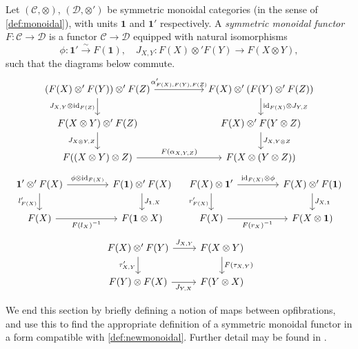 \documentclass{MetricNotes2023}
\def\id{\ensuremath\text{id}}
\begin{document}
\begin{definition}
Let \((\mathcal{C}, \otimes)\), \((\mathcal{D}, \otimes')\) be symmetric monoidal categories (in the sense of \ref{def:monoidal}), with units \(\textbf{1}\) and \(\textbf{1}'\) respectively. A \textit{symmetric monoidal functor} \(F : \mathcal{C} \to \mathcal{D}\) is a functor \(\mathcal{C} \to \mathcal{D}\) equipped with natural isomorphisms
\[\phi : \textbf{1}'\xrightarrow\sim F(\textbf{1}), \quad J_{X,Y} : F(X)\otimes' F(Y) \to F(X\otimes Y),\]
such that the diagrams below commute.
\[\begin{tikzcd}[column sep=12ex]
(F(X)\otimes' F(Y))\otimes' F(Z) \arrow[r, "\alpha'_{F(X), F(Y), F(Z)}"] \arrow[d, swap, "J_{X,Y}\otimes\id_{F(Z)}"]  & F(X)\otimes' (F(Y)\otimes' F(Z)) \arrow[d, "\id_{F(X)}\otimes J_{Y,Z}"]  \\
F(X\otimes Y)\otimes' F(Z) \arrow[d, swap, "J_{X\otimes Y, Z}"]  & F(X)\otimes'F(Y\otimes Z) \arrow[d, "J_{X, Y\otimes Z}"]\\
F((X\otimes Y)\otimes Z) \arrow[r, "F(\alpha_{X,Y,Z})"] & F(X\otimes (Y\otimes Z))
\end{tikzcd}\]
\[\begin{tikzcd}[column sep=10ex]
\textbf{1}'\otimes' F(X) \arrow[r, "\phi\otimes\id_{F(X)}"] \arrow[d, swap, "l'_{F(X)}"]  & F(\textbf{1})\otimes' F(X) \arrow[d, "J_{\textbf{1}, X}"]  \\
F(X) \arrow[r, swap, "F(l_X)^{-1}"]  & F(\textbf{1}\otimes X)
\end{tikzcd}\quad \begin{tikzcd}[column sep=10ex]
F(X) \otimes \textbf{1}' \arrow[r, "\id_{F(X)}\otimes\phi"] \arrow[d, swap, "r'_{F(X)}"]  & F(X)\otimes' F(\textbf{1}) \arrow[d, "J_{X, \textbf{1}}"]  \\
F(X) \arrow[r, swap, "F(r_X)^{-1}"]  & F(X\otimes \textbf{1})
\end{tikzcd}\]
\[\begin{tikzcd}
F(X)\otimes'F(Y) \arrow[r, "J_{X, Y}"] \arrow[d, swap, "\tau'_{X, Y}"]  & F(X\otimes Y) \arrow[d, "F(\tau_{X,Y})"]  \\
F(Y)\otimes F(X) \arrow[r, swap, "J_{Y, X}"]  & F(Y\otimes X)
\end{tikzcd}\]
\end{definition}

We end this section by briefly defining a notion of maps between opfibrations, and use this to find the appropriate definition of a symmetric monoidal functor in a form compatible with \ref{def:newmonoidal}. Further detail may be found in \autocite{symmetricmonoidal}. 
\end{document}
